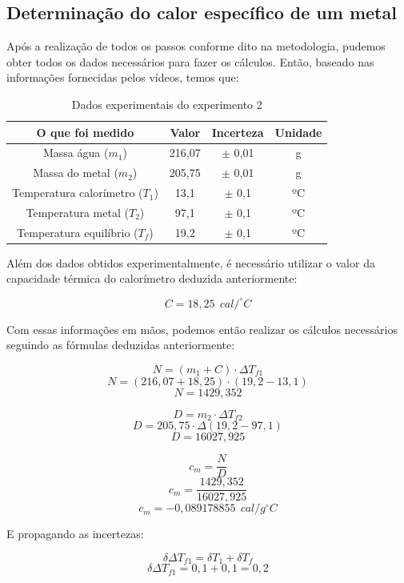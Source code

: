 \subsection{Determinação do calor específico de um metal}

Após a realização de todos os passos conforme dito na metodologia, pudemos obter todos os dados necessários para fazer os cálculos. Então, baseado nas informações fornecidas pelos vídeos, temos que:

\begin{table}[H]
    \centering
    \begin{tabular}{ |c||c||c||c| }
        \hline
        \textbf{O que foi medido} & \textbf{Valor} & \textbf{Incerteza} & \textbf{Unidade}\\
        \hline 
        Massa água ($m_1$) & 216,07 & $\pm$ 0,01 & g \\
        Massa do metal ($m_2$) & 205,75 & $\pm$ 0,01 & g \\
        \hline
        Temperatura calorímetro ($T_1$) & 13,1 & $\pm$ 0,1 & ºC \\
        Temperatura metal ($T_2$) & 97,1 & $\pm$ 0,1 & ºC \\
        Temperatura equilíbrio ($T_f$) & 19,2 & $\pm$ 0,1 & ºC \\
        \hline
        \end{tabular}
    \caption{Dados experimentais do experimento 2} 
\end{table}

Além dos dados obtidos experimentalmente, é necessário utilizar o valor da capacidade térmica do calorímetro deduzida anteriormente:

\[ C = 18,25 \ \ cal/^\circ C \]

Com essas informações em mãos, podemos então realizar os cálculos necessários seguindo as fórmulas deduzidas anteriormente:

\[ N = (m_1 + C) \cdot \Delta T_{f1} \]
\[ N = (216,07 + 18,25) \cdot (19,2 - 13,1) \]
\[ N = 1429,352 \]

\[ D = m_2 \cdot \Delta T_{f2} \]
\[ D = 205,75 \cdot \Delta (19,2 - 97,1) \]
\[ D = 16027,925 \]

\[ c_m = \frac{N}{D} \]
\[ c_m = \frac{1429,352}{16027,925} \]
\[ c_m = - 0,089178855 \ \ cal/g^\circ C \]

E propagando as incertezas:

\[ \delta \Delta T_{f1} = \delta T_1 + \delta T_f \]
\[ \delta \Delta T_{f1} = 0,1 + 0,1 = 0,2 \]

